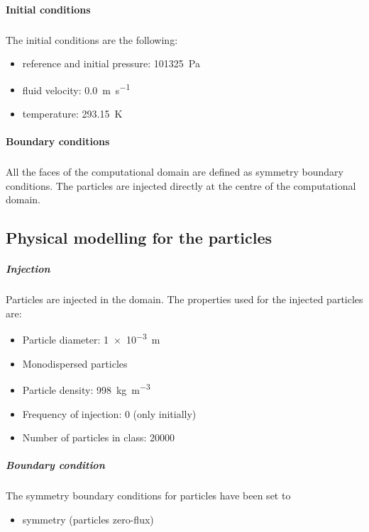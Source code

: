 \paragraph{Initial conditions}
\subparagraph{} The initial conditions are the following:
\begin{itemize}
 \item reference and initial pressure: \SI{101325}{Pa}
 \item fluid velocity: \SI{0.0}{m.s^{-1}}
 \item temperature: \SI{293.15}{K}
\end{itemize}

\paragraph{Boundary conditions}



\subparagraph{} All the faces of the computational domain are defined as symmetry boundary conditions. The particles are injected directly at the centre of the computational domain.

\subsection{Physical modelling for the particles}
\subparagraph{Injection} Particles are injected in the domain. The properties used for the injected particles are:
\begin{itemize}
 \item Particle diameter: \SI{1e-3}{m}
 \item Monodispersed particles
 \item Particle density: \SI{998}{kg.m^{-3}}
 \item Frequency of injection: 0 (only initially)
 \item Number of particles in class: \SI{20000}{}
\end{itemize}
\subparagraph{Boundary condition} The symmetry boundary conditions for particles have been set to
\begin{itemize}
 \item symmetry (particles zero-flux)
\end{itemize}

